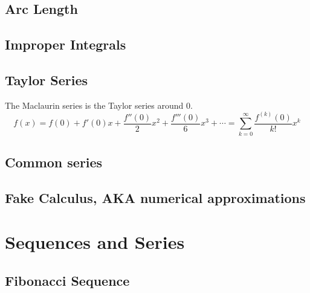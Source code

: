 \documentclass[fleqn,a4paper,11pt]{article}
\begin{document}

    \subsection{Arc Length}

    \subsection{Improper Integrals}


    \subsection{Taylor Series}

    The Maclaurin series is the Taylor series around \(0\).
    \begin{equation}
    f(x) = f(0) + f'(0) x + \frac{f''(0)} 2 x^2 + \frac{f'''(0)}{6}x^3 +\dotsb
      = \sum_{k=0}^\infty \frac{f^{(k)}(0)}{k!}x^k
    \end{equation}

    \subsection{Common series}

    \subsection{Fake Calculus, AKA numerical approximations}

    \section{Sequences and Series}

    \subsection{Fibonacci Sequence}
\end{document}
